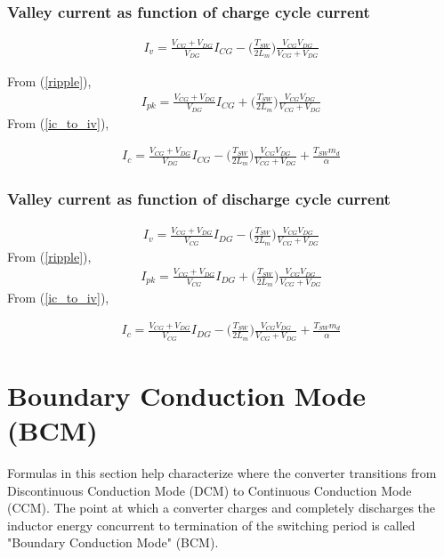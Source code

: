 \documentclass{scrartcl}
\begin{document}
		\subsubsection{Valley current as function of charge cycle current}
			\begin{align}
			I_{v} = \frac{V_{CG} + V_{DG}}{V_{DG}} I_{CG} - \bigg(\frac{T_{SW}}{2L_m}\bigg)\frac{V_{CG}V_{DG}}{V_{CG} + V_{DG}} 
			\end{align}	
			
			From (\ref{ripple}),
			\begin{align}
			I_{pk} = \frac{V_{CG} + V_{DG}}{V_{DG}} I_{CG} + \bigg(\frac{T_{SW}}{2L_m}\bigg)\frac{V_{CG}V_{DG}}{V_{CG} + V_{DG}} 
			\end{align}	
			From (\ref{ic_to_iv}),

			\begin{align}
			I_{c} = \frac{V_{CG} + V_{DG}}{V_{DG}} I_{CG} - \bigg(\frac{T_{SW}}{2L_m}\bigg)\frac{V_{CG}V_{DG}}{V_{CG} + V_{DG}} + \frac{T_{SW}m_d} {\alpha}
			\end{align}				
				
			\subsubsection{Valley current as function of discharge cycle current}
			\begin{align}
			I_{v} = \frac{V_{CG} + V_{DG}}{V_{CG}} I_{DG} - \bigg(\frac{T_{SW}}{2L_m}\bigg)\frac{V_{CG}V_{DG}}{V_{CG} + V_{DG}} 
			\end{align}				
			From (\ref{ripple}),
			\begin{align}
			I_{pk} = \frac{V_{CG} + V_{DG}}{V_{CG}} I_{DG} + \bigg(\frac{T_{SW}}{2L_m}\bigg)\frac{V_{CG}V_{DG}}{V_{CG} + V_{DG}} 
			\end{align}	
			From (\ref{ic_to_iv}),
			
			\begin{align}
			I_{c} = \frac{V_{CG} + V_{DG}}{V_{CG}} I_{DG} - \bigg(\frac{T_{SW}}{2L_m}\bigg)\frac{V_{CG}V_{DG}}{V_{CG} + V_{DG}} + \frac{T_{SW}m_d} {\alpha}
			\end{align}	

	\section{Boundary Conduction Mode (BCM)}
	Formulas in this section help characterize where the converter transitions from Discontinuous Conduction Mode (DCM) to Continuous Conduction Mode (CCM). The point at which a converter charges and completely discharges the inductor energy concurrent to termination of the switching period is called "Boundary Conduction Mode" (BCM).
\end{document}
